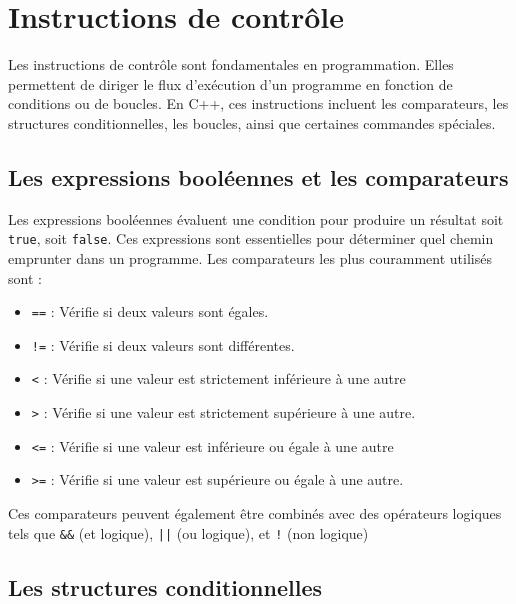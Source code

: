 \chapter{Instructions de contrôle}

Les instructions de contrôle sont fondamentales en programmation. Elles permettent de diriger le flux d'exécution d’un programme en fonction de conditions ou de boucles. En C++, ces instructions incluent les comparateurs, les structures conditionnelles, les boucles, ainsi que certaines commandes spéciales.

\section{Les expressions booléennes et les comparateurs}

Les expressions booléennes évaluent une condition pour produire un résultat soit \lstinline[]|true|, soit \lstinline[]|false|. Ces expressions sont essentielles pour déterminer quel chemin emprunter dans un programme. Les comparateurs les plus couramment utilisés sont :


\begin{itemize}
	\item \lstinline[]|==| : Vérifie si deux valeurs sont égales.
	\item \lstinline[]|!=| : Vérifie si deux valeurs sont différentes.
	\item \lstinline[]|<| : Vérifie si une valeur est strictement inférieure à une autre
	\item \lstinline[]|>| : Vérifie si une valeur est strictement supérieure à une autre.
	\item \lstinline[]|<=| : Vérifie si une valeur est inférieure ou égale à une autre
	\item \lstinline[]|>=| : Vérifie si une valeur est supérieure ou égale à une autre.
\end{itemize}


Ces comparateurs peuvent également être combinés avec des opérateurs logiques tels que \lstinline|&&| (et logique), \lstinline/||/ (ou logique), et \lstinline|!| (non logique)




\section{Les structures conditionnelles}

